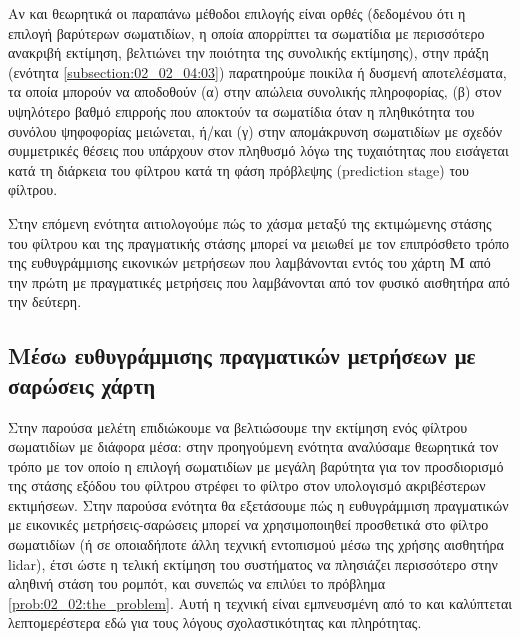 Αν και θεωρητικά οι παραπάνω μέθοδοι επιλογής είναι ορθές (δεδομένου ότι η
επιλογή βαρύτερων σωματιδίων, η οποία απορρίπτει τα σωματίδια με περισσότερο
ανακριβή εκτίμηση, βελτιώνει την ποιότητα της συνολικής εκτίμησης), στην πράξη
(ενότητα \ref{subsection:02_02_04:03}) παρατηρούμε ποικίλα ή δυσμενή
αποτελέσματα, τα οποία μπορούν να αποδοθούν (α) στην απώλεια συνολικής
πληροφορίας, (β) στον υψηλότερο βαθμό επιρροής που αποκτούν τα σωματίδια όταν η
πληθικότητα του συνόλου ψηφοφορίας μειώνεται, ή/και (γ) στην απομάκρυνση
σωματιδίων με σχεδόν συμμετρικές θέσεις που υπάρχουν στον πληθυσμό λόγω της
τυχαιότητας που εισάγεται κατά τη διάρκεια του φίλτρου κατά τη φάση πρόβλεψης
(prediction stage) του φίλτρου.

Στην επόμενη ενότητα αιτιολογούμε πώς το χάσμα μεταξύ της εκτιμώμενης στάσης
του φίλτρου και της πραγματικής στάσης μπορεί να μειωθεί με τον επιπρόσθετο
τρόπο της ευθυγράμμισης εικονικών μετρήσεων που λαμβάνονται εντός του χάρτη
$\bm{M}$ από την πρώτη με πραγματικές μετρήσεις που λαμβάνονται από τον φυσικό
αισθητήρα από την δεύτερη.

\subsection{Μέσω ευθυγράμμισης πραγματικών μετρήσεων με σαρώσεις χάρτη}
\label{subsection:02_02_03:02}

Στην παρούσα μελέτη επιδιώκουμε να βελτιώσουμε την εκτίμηση ενός φίλτρου
σωματιδίων με διάφορα μέσα: στην προηγούμενη ενότητα αναλύσαμε θεωρητικά τον
τρόπο με τον οποίο η επιλογή σωματιδίων με μεγάλη βαρύτητα για τον προσδιορισμό
της στάσης εξόδου του φίλτρου στρέφει το φίλτρο στον υπολογισμό ακριβέστερων
εκτιμήσεων. Στην παρούσα ενότητα θα εξετάσουμε πώς η ευθυγράμμιση πραγματικών
με εικονικές μετρήσεις-σαρώσεις μπορεί να χρησιμοποιηθεί προσθετικά στο φίλτρο
σωματιδίων (ή σε οποιαδήποτε άλλη τεχνική εντοπισμού μέσω της χρήσης
αισθητήρα lidar), έτσι ώστε η τελική εκτίμηση του συστήματος να
πλησιάζει περισσότερο στην αληθινή στάση του ρομπότ, και συνεπώς να επιλύει
το πρόβλημα \ref{prob:02_02:the_problem}. Αυτή η τεχνική είναι εμπνευσμένη από
το \cite{Vasiljevic2016a} και καλύπτεται λεπτομερέστερα εδώ για τους λόγους
σχολαστικότητας και πληρότητας.


